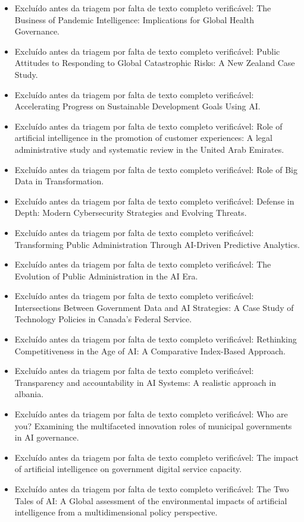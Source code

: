 \documentclass[12pt,a4paper]{article}
\begin{document}
\begin{itemize}
\item Excluído antes da triagem por falta de texto completo verificável: The Business of Pandemic Intelligence: Implications for Global Health Governance.
\item Excluído antes da triagem por falta de texto completo verificável: Public Attitudes to Responding to Global Catastrophic Risks: A New Zealand Case Study.
\item Excluído antes da triagem por falta de texto completo verificável: Accelerating Progress on Sustainable Development Goals Using AI.
\item Excluído antes da triagem por falta de texto completo verificável: Role of artificial intelligence in the promotion of customer experiences: A legal administrative study and systematic review in the United Arab Emirates.
\item Excluído antes da triagem por falta de texto completo verificável: Role of Big Data in Transformation.
\item Excluído antes da triagem por falta de texto completo verificável: Defense in Depth: Modern Cybersecurity Strategies and Evolving Threats.
\item Excluído antes da triagem por falta de texto completo verificável: Transforming Public Administration Through AI-Driven Predictive Analytics.
\item Excluído antes da triagem por falta de texto completo verificável: The Evolution of Public Administration in the AI Era.
\item Excluído antes da triagem por falta de texto completo verificável: Intersections Between Government Data and AI Strategies: A Case Study of Technology Policies in Canada's Federal Service.
\item Excluído antes da triagem por falta de texto completo verificável: Rethinking Competitiveness in the Age of AI: A Comparative Index-Based Approach.
\item Excluído antes da triagem por falta de texto completo verificável: Transparency and accountability in AI Systems: A realistic approach in albania.
\item Excluído antes da triagem por falta de texto completo verificável: Who are you? Examining the multifaceted innovation roles of municipal governments in AI governance.
\item Excluído antes da triagem por falta de texto completo verificável: The impact of artificial intelligence on government digital service capacity.
\item Excluído antes da triagem por falta de texto completo verificável: The Two Tales of AI: A Global assessment of the environmental impacts of artificial intelligence from a multidimensional policy perspective.

\end{itemize}
\end{document}
